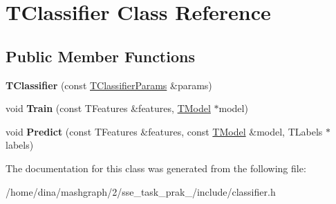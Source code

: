 \hypertarget{class_t_classifier}{\section{T\-Classifier Class Reference}
\label{class_t_classifier}
}
\subsection*{Public Member Functions}
\begin{DoxyCompactItemize}
\item 
\hypertarget{class_t_classifier_a8b6780b3418bc0b42827328e42767174}{{\bfseries T\-Classifier} (const \hyperlink{struct_t_classifier_params}{T\-Classifier\-Params} \&params)}\label{class_t_classifier_a8b6780b3418bc0b42827328e42767174}

\item 
\hypertarget{class_t_classifier_af8244b945b07e0dae39a9c748461f4da}{void {\bfseries Train} (const T\-Features \&features, \hyperlink{class_t_model}{T\-Model} $\ast$model)}\label{class_t_classifier_af8244b945b07e0dae39a9c748461f4da}

\item 
\hypertarget{class_t_classifier_ae6e36a624e6e77b7e21e8b7ef9a69bf3}{void {\bfseries Predict} (const T\-Features \&features, const \hyperlink{class_t_model}{T\-Model} \&model, T\-Labels $\ast$labels)}\label{class_t_classifier_ae6e36a624e6e77b7e21e8b7ef9a69bf3}

\end{DoxyCompactItemize}


The documentation for this class was generated from the following file\-:\begin{DoxyCompactItemize}
\item 
/home/dina/mashgraph/2/sse\-\_\-task\-\_\-prak\-\_/include/classifier.\-h\end{DoxyCompactItemize}
